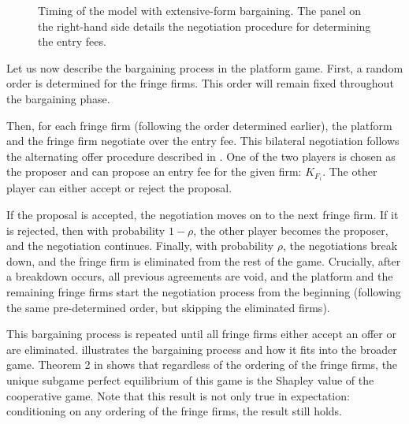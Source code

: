 \begin{figure}
    \caption{Timing of the model with extensive-form bargaining. The panel on the right-hand side details the negotiation procedure for determining the entry fees.}
    \label{fig:bargaining_microfoundations}
\end{figure}

Let us now describe the bargaining process in the platform game.
First, a random order is determined for the fringe firms.
This order will remain fixed throughout the bargaining phase.

Then, for each fringe firm (following the order determined earlier), the platform and the fringe firm negotiate over the entry fee.
This bilateral negotiation follows the alternating offer procedure described in \textcite{binmore1986nash}.
One of the two players is chosen as the proposer and can propose an entry fee for the given firm: $K_{F_i}$.
The other player can either accept or reject the proposal.

If the proposal is accepted, the negotiation moves on to the next fringe firm.
If it is rejected, then with probability $1-\rho$, the other player becomes the proposer, and the negotiation continues.
Finally, with probability $\rho$, the negotiations break down, and the fringe firm is eliminated from the rest of the game.
Crucially, after a breakdown occurs, all previous agreements are void, and the platform and the remaining fringe firms start the negotiation process from the beginning (following the same pre-determined order, but skipping the eliminated firms).

This bargaining process is repeated until all fringe firms either accept an offer or are eliminated.
 illustrates the bargaining process and how it fits into the broader game.
Theorem 2 in \textcite{stole1996intra} shows that regardless of the ordering of the fringe firms, the unique subgame perfect equilibrium of this game is the Shapley value of the cooperative game.
Note that this result is not only true in expectation: conditioning on any ordering of the fringe firms, the result still holds.

